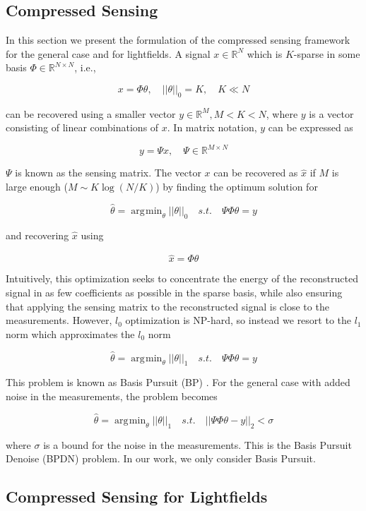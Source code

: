 \documentclass[10pt,twocolumn,letterpaper]{article}
\DeclareMathOperator*{\argmin}{\arg\!\min}
\begin{document}
\subsection{Compressed Sensing}

In this section we present the formulation of the compressed sensing framework \cite{CSPaper} for the general case and for lightfields. A signal $x \in \mathbb{R}^N$ which is $K$-sparse in some basis $\Phi \in \mathbb{R}^{N\times N}$, i.e.,

\[ x = \Phi \theta, \quad ||\theta||_0 = K, \quad K \ll N\]

can be recovered using a smaller vector $y \in \mathbb{R}^M, M < K < N$, where $y$ is a vector consisting of linear combinations of $x$. In matrix notation, $y$ can be expressed as 

\[ y = \Psi x, \quad \Psi \in \mathbb{R}^{M \times N}\]

$\Psi$ is known as the sensing matrix. The vector $x$ can be recovered as $\hat{x}$ if $M$ is large enough ($M \sim K\log(N/K)$) by finding the optimum solution for 

\[ \hat{\theta} = \argmin_\theta ||\theta||_0 \quad s.t. \quad \Psi\Phi\theta = y\]

and recovering $\hat{x}$ using

\[ \hat{x} = \Phi \hat{\theta}\]

Intuitively, this optimization seeks to concentrate the energy of the reconstructed signal in as few coefficients as possible in the sparse basis, while also ensuring that applying the sensing matrix to the reconstructed signal is close to the measurements. However, $l_0$ optimization is NP-hard, so instead we resort to the $l_1$ norm which approximates the $l_0$ norm

\[ \hat{\theta} = \argmin_\theta ||\theta||_1 \quad s.t. \quad \Psi\Phi\theta = y\]

This problem is known as Basis Pursuit (BP) \cite{BasisPursuit1}. For the general case with added noise in the measurements, the problem becomes

\[ \hat{\theta} = \argmin_\theta ||\theta||_1 \quad s.t. \quad ||\Psi\Phi\theta - y||_2 < \sigma\]


where $\sigma$ is a bound for the noise in the measurements. This is the Basis Pursuit Denoise (BPDN) problem. In our work, we only consider Basis Pursuit.

\subsection{Compressed Sensing for Lightfields}
\end{document}
